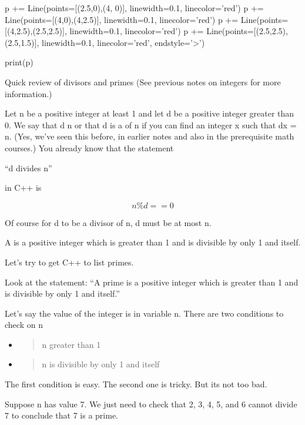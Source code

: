 \begin{console}
\begin{python}
p += Line(points=[(2.5,0),(4, 0)], linewidth=0.1, linecolor='red')
p += Line(points=[(4,0),(4,2.5)], linewidth=0.1, linecolor='red')
p += Line(points=[(4,2.5),(2.5,2.5)], linewidth=0.1, linecolor='red')
p += Line(points=[(2.5,2.5),(2.5,1.5)], linewidth=0.1, linecolor='red', endstyle='>')

print(p)
\end{python}


\newpage{}

Quick review of divisors and primes (See previous notes on integers for
more information.)

Let n be a positive integer at least 1 and let d be a positive integer
greater than 0. We say that d  n or that d is a
 of n if you can find an integer x such that dx = n.
(Yes, we've seen this before, in earlier notes and also
in the prerequisite math courses.) You already know that the statement
\begin{center}
``d divides n''
\end{center}
in C++ is

\[n \% d == 0\]

Of course for d to be a divisor of n, d must be at most n.

A  is a positive integer which is greater than 1 and is
divisible by only 1 and itself.

Let's try to get C++ to list primes.

Look at the statement: ``A prime is a positive integer which is greater
than 1 and is divisible by only 1 and itself.''

Let's say the value of the integer is in variable n.
There are two conditions to check on n

\begin{itemize}
\item
  \begin{quote}
  n greater than 1
  \end{quote}
\item
  \begin{quote}
  n is divisible by only 1 and itself
  \end{quote}
\end{itemize}

The first condition is easy. The second one is tricky. But its not too
bad.

Suppose n has value 7. We just need to check that 2, 3, 4, 5, and 6
cannot divide 7 to conclude that 7 is a prime.


\end{console}
